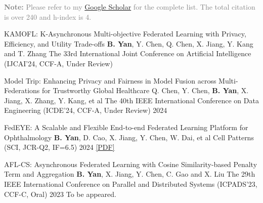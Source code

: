 
\begin{cvparagraph}
\textcolor{gray}{\textbf{Note:} Please refer to my \href{https://scholar.google.com/citations?hl=en&user=DVsgN1sAAAAJ}{Google Scholar} for the complete list. The total citation is over 240 and h-index is 4.}
\end{cvparagraph}

\begin{cvpublications}

\cvpublication
{KAMOFL: K-Asynchronous Multi-objective Federated Learning with Privacy, Efficiency, and Utility Trade-offs} %
{\textbf{B. Yan}, Y. Chen, Q. Chen, X. Jiang, Y. Kang and T. Zhang} %
{The 33rd International Joint Conference on Artificial Intelligence (IJCAI'24, CCF-A, Under Review)} %
{} %
{} %


\cvpublication
{Model Trip: Enhancing Privacy and Fairness in Model Fusion across Multi-Federations for Trustworthy Global Healthcare} %
{Q. Chen, Y. Chen, \textbf{B. Yan}, X. Jiang, X. Zhang, Y. Kang, et al} %
{The 40th IEEE International Conference on Data Engineering (ICDE'24, CCF-A, Under Review)} %
{2024} %
{} %


\cvpublication
{FedEYE: A Scalable and Flexible End-to-end Federated Learning Platform for Ophthalmology} %
{\textbf{B. Yan}, D. Cao, X. Jiang, Y. Chen, W. Dai, et al} %
{Cell Patterns (SCI, JCR-Q2, IF=6.5)} %
{2024} %
{\href{https://www.cell.com/patterns/fulltext/S2666-3899(24)00019-9}{[PDF]}} %


\cvpublication
{AFL-CS: Asynchronous Federated Learning with Cosine Similarity-based Penalty Term and Aggregation} %
{\textbf{B. Yan}, X. Jiang, Y. Chen, C. Gao and X. Liu} %
{The 29th IEEE International Conference on Parallel and Distributed Systems (ICPADS'23, CCF-C, Oral)} %
{2023} %
{To be appeared.} %


\end{cvpublications}
